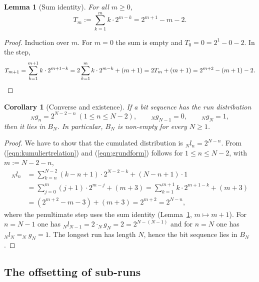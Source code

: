 \documentclass[11pt,a4paper]{scrartcl}
\theoremstyle{plain}
\newtheorem{lemma}[satz]{Lemma}
\newtheorem{korollar}[satz]{Corollary}
\theoremstyle{definition}
\theoremstyle{remark}
\begin{document}
\begin{lemma}[Sum identity]\label{lem:summenidentitaet}
For all $m\geq 0$,
\begin{equation}\label{eqn:summenidentitaet}
  T_m:=\sum_{k=1}^{m} k\cdot 2^{m-k}=2^{m+1}-m-2.
\end{equation}
\end{lemma}

\begin{proof}
Induction over $m$. For $m=0$ the sum is empty and
$T_0=0=2^{1}-0-2$. In the step,
\begin{equation*}
  T_{m+1}=\sum_{k=1}^{m+1}k\cdot 2^{m+1-k}
  =2\sum_{k=1}^{m}k\cdot 2^{m-k}+(m+1)
  =2T_m+(m+1)
  =2^{m+2}-(m+1)-2.\qedhere
\end{equation*}
\end{proof}

\begin{korollar}[Converse and existence]\label{kor:umkehrung}
If a bit sequence has the run distribution
\begin{equation}\label{eqn:grundform}
  _Ng_n=2^{N-2-n}\ (1\leq n\leq N-2),\qquad _Ng_{N-1}=0,\qquad _Ng_N=1,
\end{equation}
then it lies in $B_N$. In particular, $B_N$ is non-empty for every
$N\geq 1$.
\end{korollar}

\begin{proof}
We have to show that the cumulated distribution is $_Nl_n=2^{N-n}$.
From (\ref{eqn:kumuliertrelation}) and (\ref{eqn:grundform}) follows
for $1\leq n\leq N-2$, with $m:=N-2-n$,
\begin{align*}
  _Nl_n&=\sum_{k=n}^{N-2}\left(k-n+1\right)\cdot 2^{N-2-k}
  +\left(N-n+1\right)\cdot 1\\
  &=\sum_{j=0}^{m}\left(j+1\right)\cdot 2^{m-j}+\left(m+3\right)
  =\sum_{k=1}^{m+1} k\cdot 2^{m+1-k}+\left(m+3\right)\\
  &=\left(2^{m+2}-m-3\right)+\left(m+3\right)=2^{m+2}=2^{N-n},
\end{align*}
where the penultimate step uses the sum identity
(Lemma~\ref{lem:summenidentitaet}, $m\mapsto m+1$). For $n=N-1$ one
has $_Nl_{N-1}=2\cdot _Ng_N=2=2^{N-(N-1)}$ and for $n=N$ one has
$_Nl_N=_Ng_N=1$. The longest run has length $N$, hence the bit
sequence lies in $B_N$.
\end{proof}

\subsection{The offsetting of sub-runs}
\end{document}
